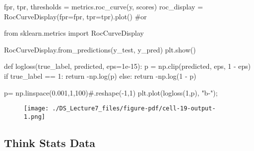 \documentclass[
  letterpaper,
  DIV=11,
  numbers=noendperiod]{scrreprt}
\newenvironment{Shaded}{\begin{snugshade}}{\end{snugshade}}
\newcommand{\CommentTok}[1]{\textcolor[rgb]{0.37,0.37,0.37}{#1}}
\newcommand{\ControlFlowTok}[1]{\textcolor[rgb]{0.00,0.23,0.31}{#1}}
\newcommand{\DecValTok}[1]{\textcolor[rgb]{0.68,0.00,0.00}{#1}}
\newcommand{\FloatTok}[1]{\textcolor[rgb]{0.68,0.00,0.00}{#1}}
\newcommand{\ImportTok}[1]{\textcolor[rgb]{0.00,0.46,0.62}{#1}}
\newcommand{\KeywordTok}[1]{\textcolor[rgb]{0.00,0.23,0.31}{#1}}
\newcommand{\NormalTok}[1]{\textcolor[rgb]{0.00,0.23,0.31}{#1}}
\newcommand{\OperatorTok}[1]{\textcolor[rgb]{0.37,0.37,0.37}{#1}}
\newcommand{\StringTok}[1]{\textcolor[rgb]{0.13,0.47,0.30}{#1}}
\begin{document}
\begin{Shaded}
\begin{Highlighting}[]
\NormalTok{fpr, tpr, thresholds }\OperatorTok{=}\NormalTok{ metrics.roc\_curve(y, scores)}
\NormalTok{roc\_display }\OperatorTok{=}\NormalTok{ RocCurveDisplay(fpr}\OperatorTok{=}\NormalTok{fpr, tpr}\OperatorTok{=}\NormalTok{tpr).plot()}
\CommentTok{\#or}

\ImportTok{from}\NormalTok{ sklearn.metrics }\ImportTok{import}\NormalTok{ RocCurveDisplay}

\NormalTok{RocCurveDisplay.from\_predictions(y\_test, y\_pred)}
\NormalTok{plt.show()}

\end{Highlighting}
\end{Shaded}

\begin{Shaded}
\begin{Highlighting}[]
\KeywordTok{def}\NormalTok{ logloss(true\_label, predicted, eps}\OperatorTok{=}\FloatTok{1e{-}15}\NormalTok{):}
\NormalTok{    p }\OperatorTok{=}\NormalTok{ np.clip(predicted, eps, }\DecValTok{1} \OperatorTok{{-}}\NormalTok{ eps)}
    \ControlFlowTok{if}\NormalTok{ true\_label }\OperatorTok{==} \DecValTok{1}\NormalTok{:}
        \ControlFlowTok{return} \OperatorTok{{-}}\NormalTok{np.log(p)}
    \ControlFlowTok{else}\NormalTok{:}
        \ControlFlowTok{return} \OperatorTok{{-}}\NormalTok{np.log(}\DecValTok{1} \OperatorTok{{-}}\NormalTok{ p)}
\end{Highlighting}
\end{Shaded}

\begin{Shaded}
\begin{Highlighting}[]
\NormalTok{p}\OperatorTok{=}\NormalTok{ np.linspace(}\FloatTok{0.001}\NormalTok{,}\DecValTok{1}\NormalTok{,}\DecValTok{100}\NormalTok{)}\CommentTok{\#.reshape({-}1,1)}
\NormalTok{plt.plot(logloss(}\DecValTok{1}\NormalTok{,p), }\StringTok{"b{-}"}\NormalTok{)}\OperatorTok{;}
\end{Highlighting}
\end{Shaded}

\begin{figure}[H]

{\centering \texttt{[image: ./DS\_Lecture7\_files/figure-pdf/cell-19-output-1.png]}

}

\end{figure}

\hypertarget{think-stats-data}{%
\subsection{Think Stats Data}\label{think-stats-data}}
\end{document}
